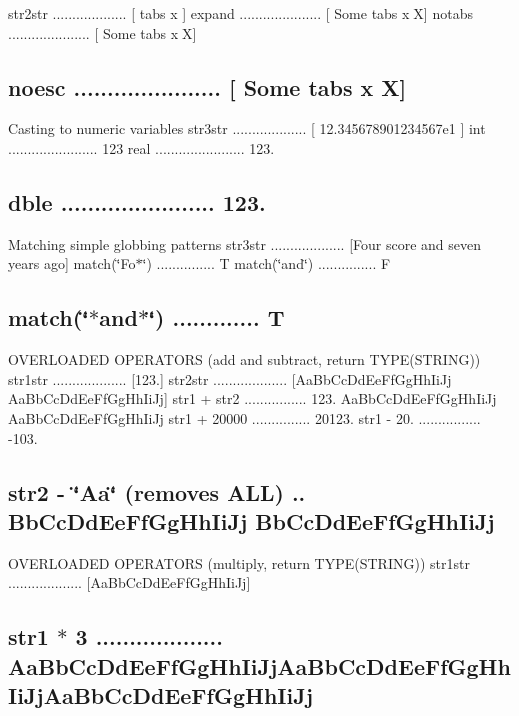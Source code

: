 str2str ................... \mbox{[} tabs x \mbox{]} expand ..................... \mbox{[} Some tabs xX\mbox{]} notabs ..................... \mbox{[} Some tabs xX\mbox{]} \subsection*{noesc ...................... \mbox{[} Some tabs x X\mbox{]} }

Casting to numeric variables str3str ................... \mbox{[} 12.\+345678901234567e1 \mbox{]} int ....................... 123 real ....................... 123. \subsection*{dble ....................... 123. }

Matching simple globbing patterns str3str ................... \mbox{[}Four score and seven years ago\mbox{]} match(\char`\"{}\+Fo$\ast$\char`\"{}) ............... T match(\char`\"{}and\char`\"{}) ............... F \subsection*{match(\char`\"{}$\ast$and$\ast$\char`\"{}) ............. T }

O\+V\+E\+R\+L\+O\+A\+D\+ED O\+P\+E\+R\+A\+T\+O\+RS (add and subtract, return T\+Y\+P\+E(\+S\+T\+R\+I\+N\+G)) str1str ................... \mbox{[}123.\mbox{]} str2str ................... \mbox{[}Aa\+Bb\+Cc\+Dd\+Ee\+Ff\+Gg\+Hh\+Ii\+Jj Aa\+Bb\+Cc\+Dd\+Ee\+Ff\+Gg\+Hh\+Ii\+Jj\mbox{]} str1 + str2 ................ 123. Aa\+Bb\+Cc\+Dd\+Ee\+Ff\+Gg\+Hh\+Ii\+Jj Aa\+Bb\+Cc\+Dd\+Ee\+Ff\+Gg\+Hh\+Ii\+Jj str1 + 20000 ............... 20123. str1 -\/ 20. ................ -\/103. \subsection*{str2 -\/ \char`\"{}\+Aa\char`\"{} (removes A\+LL) .. Bb\+Cc\+Dd\+Ee\+Ff\+Gg\+Hh\+Ii\+Jj Bb\+Cc\+Dd\+Ee\+Ff\+Gg\+Hh\+Ii\+Jj }

O\+V\+E\+R\+L\+O\+A\+D\+ED O\+P\+E\+R\+A\+T\+O\+RS (multiply, return T\+Y\+P\+E(\+S\+T\+R\+I\+N\+G)) str1str ................... \mbox{[}Aa\+Bb\+Cc\+Dd\+Ee\+Ff\+Gg\+Hh\+Ii\+Jj\mbox{]} \subsection*{str1 $\ast$ 3 ................... Aa\+Bb\+Cc\+Dd\+Ee\+Ff\+Gg\+Hh\+Ii\+Jj\+Aa\+Bb\+Cc\+Dd\+Ee\+Ff\+Gg\+Hh\+Ii\+Jj\+Aa\+Bb\+Cc\+Dd\+Ee\+Ff\+Gg\+Hh\+Ii\+Jj }

